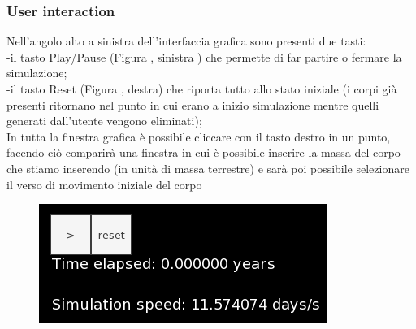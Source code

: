 \documentclass{article}
\begin{document}
\subsubsection{User interaction}
Nell'angolo alto a sinistra dell'interfaccia grafica sono presenti due tasti: \\
-il tasto Play/Pause (Figura \href{playpause}, sinistra ) che permette di far partire o fermare la simulazione;\\
-il tasto Reset (Figura \href{playpause}, destra) che riporta tutto allo stato iniziale (i corpi già presenti ritornano nel punto in cui erano a inizio simulazione mentre quelli generati dall'utente vengono eliminati); \\
In tutta la finestra grafica è possibile cliccare con il tasto destro in un punto, facendo ciò comparirà una finestra in cui è possibile inserire la massa del corpo che stiamo inserendo (in unità di massa terrestre) e sarà poi possibile selezionare il verso di movimento iniziale del corpo

\begin{figure} [H]
    \centering
    \includegraphics[height=.20\linewidth]{Playpause.png}
    \label{playpause}
\end{figure}
\end{document}
